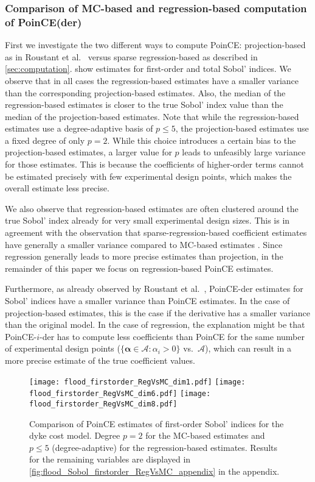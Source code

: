 \documentclass[a4paper,11pt]{article}
\newcommand{\curlyA}{{\mathcal A}}
\newcommand{\ve}[1]{\boldsymbol{#1}}
\newcommand{\alp}{{\ve{\alpha}}}
\renewcommand{\citep}[2][]{\cite[#1]{#2}}
\theoremstyle{definition}
\theoremstyle{remark}
\theoremstyle{theorem}
\begin{document}
\subsubsection{Comparison of MC-based and regression-based computation of PoinCE(der)}
First we investigate the two different ways to compute PoinCE: projection-based as in Roustant et al.~\cite{rougam20} versus sparse regression-based as described in \cref{sec:computation}. 
 show estimates for first-order and total Sobol' indices. We observe that in all cases the regression-based estimates have a smaller variance than the corresponding projection-based estimates. Also, the median of the regression-based estimates is closer to the true Sobol' index value than the median of the projection-based estimates. 
Note that while the regression-based estimates use a degree-adaptive basis of $p \leq 5$, the projection-based estimates use a fixed degree of only $p=2$. While this choice introduces a certain bias to the projection-based estimates, a larger value for $p$ leads to unfeasibly large variance for those estimates. This is because the coefficients of higher-order terms cannot be estimated precisely with few experimental design points, which makes the overall estimate less precise.

We also observe that regression-based estimates are often clustered around the true Sobol' index already for very small experimental design sizes.
This is in agreement with the observation that sparse-regression-based coefficient estimates have generally a smaller variance compared to MC-based estimates \citep[Chapter 3.4.6]{BlatmanThesis}.
Since regression generally leads to more precise estimates than projection, in the remainder of this paper we focus on regression-based PoinCE estimates.

Furthermore, as already observed by Roustant et al.~\cite{rougam20}, PoinCE-der estimates for Sobol' indices have a smaller variance than PoinCE estimates. In the case of projection-based estimates, this is the case if the derivative has a smaller variance than the original model. In the case of regression, the explanation might be that PoinCE-$i$-der has to compute less coefficients than PoinCE for the same number of experimental design points ($\{\alp \in \curlyA: \alpha_i > 0\}$ vs.\ $\curlyA$), which can result in a more precise estimate of the true coefficient values.


\begin{figure}[htbp]
	\centering
	{\texttt{[image: flood\_firstorder\_RegVsMC\_dim1.pdf]}}
	\hfill
	{\texttt{[image: flood\_firstorder\_RegVsMC\_dim6.pdf]}}
	\hfill
	{\texttt{[image: flood\_firstorder\_RegVsMC\_dim8.pdf]}}
	\caption{Comparison of PoinCE estimates of {first-order Sobol' indices} for the dyke cost model. Degree $p = 2$ for the MC-based estimates and $p \leq 5$ (degree-adaptive) for the regression-based estimates. Results for the remaining variables are displayed in \cref{fig:flood_Sobol_firstorder_RegVsMC_appendix} in the appendix.}
	\label{fig:flood_Sobol_firstorder_RegVsMC}
\end{figure}
\end{document}
